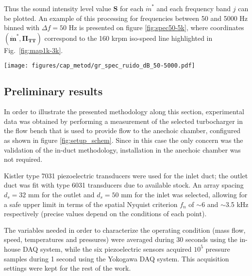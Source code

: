 Thus the sound intensity level value $\mathbf S$ for each $\dot m^*$ and each frequency band $j$ can be plotted. An example of this processing for frequencies between 50 and 5000 Hz binned with $\Delta f = 50$ Hz is presented on figure \ref{fig:spec50-5k}, where coordinates $(\bm{\dot{m}^*},\bm{\Pi_\text{TT}})$ correspond to the 160 krpm iso-speed line highlighted in Fig.~\ref{fig:map1k-3k}.

\begin{figure*}[t!]
\centering
\texttt{[image: figures/cap\_metod/gr\_spec\_ruido\_dB\_50-5000.pdf]}
\caption[Sample of spectrograms following the 160 krpm line]{Sample of spectrograms calculated using the procedure outlined in subsection \ref{sub:noise_maps_and_spectrograms}, following the 160 krpm paths marked in figure \ref{fig:map1k-3k}. The 1 -- 3 kHz band selected for the maps in figure \ref{fig:map1k-3k} is highlighted, along with some particular flow phenomena discussed in section \ref{sec:sample_meas}.}
\label{fig:spec50-5k}
\end{figure*}

\subsection{Preliminary results}
\label{sec:sample_meas}

In order to illustrate the presented methodology along this section, experimental data was obtained by performing a measurement of the selected turbocharger in the flow bench that is used to provide flow to the anechoic chamber, configured as shown in figure \ref{fig:setup_schem}. Since in this case the only concern was the validation of the in-duct methodology, installation in the anechoic chamber was not required. 

Kistler type 7031 piezoelectric transducers were used for the inlet duct; the outlet duct was fit with type 6031 transducers due to available stock. An array spacing $d_s=32$ mm for the outlet and $d_s=50$ mm for the inlet was selected, allowing for a safe upper limit in terms of the spatial Nyquist criterion $f_n$ of $\sim$6 and $\sim$3.5 kHz respectively (precise values depend on the conditions of each point).

The variables needed in order to characterize the operating condition (mass flow, speed, temperatures and pressures) were averaged during 30 seconds using the in-house DAQ system, while the six piezoelectric sensors acquired $10^5$ pressure samples during 1 second using the Yokogawa DAQ system. This acquisition settings were kept for the rest of the work.

